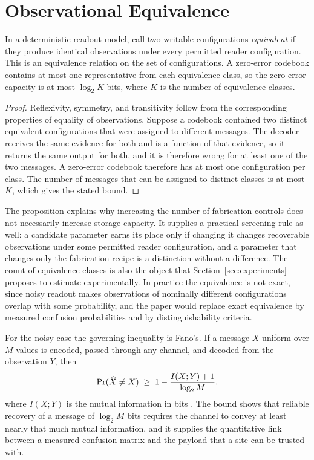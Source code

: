 \section{Observational Equivalence}\label{sec:equiv}

\begin{proposition}\label{prop:equiv}
In a deterministic readout model, call two writable configurations \emph{equivalent} if they produce identical observations under every permitted reader configuration. This is an equivalence relation on the set of configurations. A zero-error codebook contains at most one representative from each equivalence class, so the zero-error capacity is at most $\log_2 K$ bits, where $K$ is the number of equivalence classes.
\end{proposition}

\begin{proof}
Reflexivity, symmetry, and transitivity follow from the corresponding properties of equality of observations. Suppose a codebook contained two distinct equivalent configurations that were assigned to different messages. The decoder receives the same evidence for both and is a function of that evidence, so it returns the same output for both, and it is therefore wrong for at least one of the two messages. A zero-error codebook therefore has at most one configuration per class. The number of messages that can be assigned to distinct classes is at most $K$, which gives the stated bound.
\end{proof}

The proposition explains why increasing the number of fabrication controls does not necessarily increase storage capacity. It supplies a practical screening rule as well: a candidate parameter earns its place only if changing it changes recoverable observations under some permitted reader configuration, and a parameter that changes only the fabrication recipe is a distinction without a difference. The count of equivalence classes is also the object that Section~\ref{sec:experiments} proposes to estimate experimentally. In practice the equivalence is not exact, since noisy readout makes observations of nominally different configurations overlap with some probability, and the paper would replace exact equivalence by measured confusion probabilities and by distinguishability criteria.

For the noisy case the governing inequality is Fano's. If a message $X$ uniform over $M$ values is encoded, passed through any channel, and decoded from the observation $Y$, then
\[
\operatorname{Pr}(\widehat X\ne X)\;\ge\;1-\frac{I(X;Y)+1}{\log_2 M},
\]
where $I(X;Y)$ is the mutual information in bits \cite{cover2006}. The bound shows that reliable recovery of a message of $\log_2 M$ bits requires the channel to convey at least nearly that much mutual information, and it supplies the quantitative link between a measured confusion matrix and the payload that a site can be trusted with.

